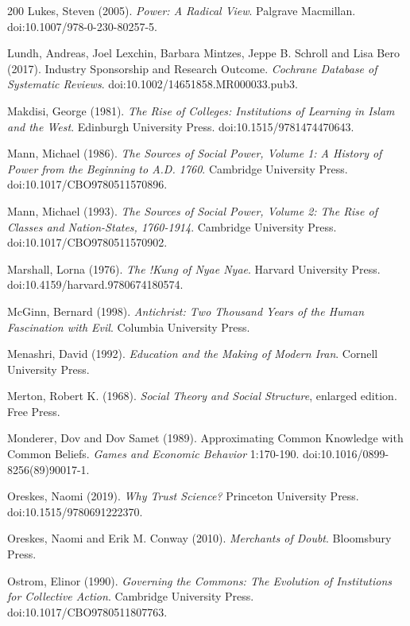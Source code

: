\documentclass[11pt,letterpaper]{article}
\theoremstyle{definition}
\theoremstyle{remark}
\begin{document}
\begin{thebibliography}{200}
Lukes, Steven (2005). \emph{Power: A Radical View}. Palgrave Macmillan. doi:10.1007/978-0-230-80257-5.

Lundh, Andreas, Joel Lexchin, Barbara Mintzes, Jeppe B. Schroll and Lisa Bero (2017). Industry Sponsorship and Research Outcome. \emph{Cochrane Database of Systematic Reviews}. doi:10.1002/14651858.MR000033.pub3.

Makdisi, George (1981). \emph{The Rise of Colleges: Institutions of Learning in Islam and the West}. Edinburgh University Press. doi:10.1515/9781474470643.

Mann, Michael (1986). \emph{The Sources of Social Power, Volume 1: A History of Power from the Beginning to A.D. 1760}. Cambridge University Press. doi:10.1017/CBO9780511570896.

Mann, Michael (1993). \emph{The Sources of Social Power, Volume 2: The Rise of Classes and Nation-States, 1760-1914}. Cambridge University Press. doi:10.1017/CBO9780511570902.

Marshall, Lorna (1976). \emph{The !Kung of Nyae Nyae}. Harvard University Press. doi:10.4159/harvard.9780674180574.

McGinn, Bernard (1998). \emph{Antichrist: Two Thousand Years of the Human Fascination with Evil}. Columbia University Press.

Menashri, David (1992). \emph{Education and the Making of Modern Iran}. Cornell University Press.

Merton, Robert K. (1968). \emph{Social Theory and Social Structure}, enlarged edition. Free Press.

Monderer, Dov and Dov Samet (1989). Approximating Common Knowledge with Common Beliefs. \emph{Games and Economic Behavior} 1:170-190. doi:10.1016/0899-8256(89)90017-1.

Oreskes, Naomi (2019). \emph{Why Trust Science?} Princeton University Press. doi:10.1515/9780691222370.

Oreskes, Naomi and Erik M. Conway (2010). \emph{Merchants of Doubt}. Bloomsbury Press.

Ostrom, Elinor (1990). \emph{Governing the Commons: The Evolution of Institutions for Collective Action}. Cambridge University Press. doi:10.1017/CBO9780511807763.


\end{thebibliography}
\end{document}
